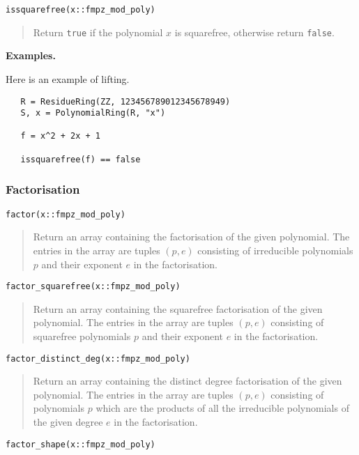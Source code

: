 \documentclass[a4paper,10pt]{article}
\newcommand{\code}{\lstinline}
\newcommand{\desc}[1]{\vspace{-3mm}\begin{quote}#1\end{quote}}
\begin{document}
{{\begin{lstlisting}
issquarefree(x::fmpz_mod_poly)
\end{lstlisting}

\desc{Return \code{true} if the polynomial $x$ is squarefree, otherwise return \code{false}.}

\textbf{Examples.}

Here is an example of lifting.

\begin{lstlisting}
   R = ResidueRing(ZZ, 123456789012345678949)
   S, x = PolynomialRing(R, "x")

   f = x^2 + 2x + 1

   issquarefree(f) == false
\end{lstlisting}

\subsubsection{Factorisation}

\begin{lstlisting}
factor(x::fmpz_mod_poly)
\end{lstlisting}

\desc{Return an array containing the factorisation of the given polynomial. The entries in
the array are tuples $(p, e)$ consisting of irreducible polynomials $p$ and their exponent
$e$ in the factorisation.}

\begin{lstlisting}
factor_squarefree(x::fmpz_mod_poly)
\end{lstlisting}

\desc{Return an array containing the squarefree factorisation of the given polynomial. The
entries in the array are tuples $(p, e)$ consisting of squarefree polynomials $p$ and their
exponent $e$ in the factorisation.}

\begin{lstlisting}
factor_distinct_deg(x::fmpz_mod_poly)
\end{lstlisting}

\desc{Return an array containing the distinct degree factorisation of the given polynomial.
The entries in the array are tuples $(p, e)$ consisting of polynomials $p$ which are the
products of all the irreducible polynomials of the given degree $e$ in the factorisation.}

\begin{lstlisting}
factor_shape(x::fmpz_mod_poly)
\end{lstlisting}

}}
\end{document}
